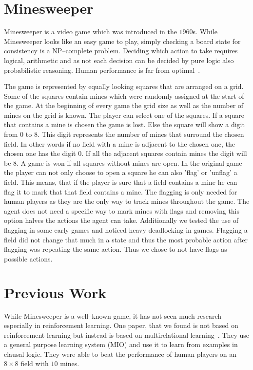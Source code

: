 \section{Minesweeper}
Minesweeper is a video game which was introduced in the $1960$s. 
While Minesweeper looks like an easy game to play, simply checking a board state for consistency is a NP--complete problem.
Deciding which action to take requires logical, arithmetic and as not each decision can be decided by pure logic also probabilistic reasoning.
Human performance is far from optimal~\cite{castillo2003learning}.

The game is represented by equally looking squares that are arranged on a grid. 
Some of the squares contain mines which were randomly assigned at the start of the game. 
At the beginning of every game the grid size as well as the number of mines on the grid is known.
The player can select one of the squares. 
If a square that contains a mine is chosen the game is lost.
Else the square will show a digit from $0$ to $8$.
This digit represents the number of mines that surround the chosen field.
In other words if no field with a mine is adjacent to the chosen one, the chosen one has the digit $0$. 
If all the adjacent squares contain mines the digit will be $8$.
A game is won if all squares without mines are open.
In the original game the player can not only choose to open a square he can also 'flag' or 'unflag' a field.
This means, that if the player is sure that a field contains a mine he can flag it to mark that that field contains a mine.
The flagging is only needed for human players as they are the only way to track mines throughout the game.
The agent does not need a specific way to mark mines with flags and removing this option halves the actions the agent can take.
Additionally we tested the use of flagging in some early games and noticed heavy deadlocking in games.
Flagging a field did not change that much in a state and thus the most probable action after flagging was repeating the same action.
Thus we chose to not have flags as possible actions.

\section{Previous Work}
While Minesweeper is a well--known game, it has not seen much research especially in reinforcement learning.
One paper, that we found is not based on reinforcement learning but instead is based on multirelational learning~\cite{castillo2003learning}.
They use a general purpose learning system (MIO) and use it to learn from examples in clausal logic.
They were able to beat the performance of human players on an $8\times8$ field with $10$ mines.